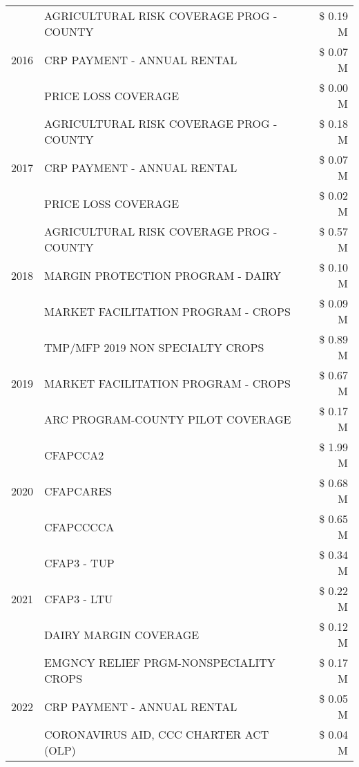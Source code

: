 \begin{tabular}{llr}
\cline{1-3}
\multirow[t]{3}{*}{2016} & AGRICULTURAL RISK COVERAGE PROG - COUNTY & \$ 0.19 M \\
 & CRP PAYMENT - ANNUAL RENTAL & \$ 0.07 M \\
 & PRICE LOSS COVERAGE & \$ 0.00 M \\
\cline{1-3}
\multirow[t]{3}{*}{2017} & AGRICULTURAL RISK COVERAGE PROG - COUNTY & \$ 0.18 M \\
 & CRP PAYMENT - ANNUAL RENTAL & \$ 0.07 M \\
 & PRICE LOSS COVERAGE & \$ 0.02 M \\
\cline{1-3}
\multirow[t]{3}{*}{2018} & AGRICULTURAL RISK COVERAGE PROG - COUNTY & \$ 0.57 M \\
 & MARGIN PROTECTION PROGRAM - DAIRY & \$ 0.10 M \\
 & MARKET FACILITATION PROGRAM - CROPS & \$ 0.09 M \\
\cline{1-3}
\multirow[t]{3}{*}{2019} & TMP/MFP 2019 NON SPECIALTY CROPS & \$ 0.89 M \\
 & MARKET FACILITATION PROGRAM - CROPS & \$ 0.67 M \\
 & ARC PROGRAM-COUNTY PILOT COVERAGE & \$ 0.17 M \\
\cline{1-3}
\multirow[t]{3}{*}{2020} & CFAPCCA2 & \$ 1.99 M \\
 & CFAPCARES & \$ 0.68 M \\
 & CFAPCCCCA & \$ 0.65 M \\
\cline{1-3}
\multirow[t]{3}{*}{2021} & CFAP3 - TUP & \$ 0.34 M \\
 & CFAP3 - LTU & \$ 0.22 M \\
 & DAIRY MARGIN COVERAGE & \$ 0.12 M \\
\cline{1-3}
\multirow[t]{3}{*}{2022} & EMGNCY RELIEF PRGM-NONSPECIALITY CROPS & \$ 0.17 M \\
 & CRP PAYMENT - ANNUAL RENTAL & \$ 0.05 M \\
 & CORONAVIRUS AID, CCC CHARTER ACT (OLP) & \$ 0.04 M \\
\cline{1-3}
\bottomrule
\end{tabular}
